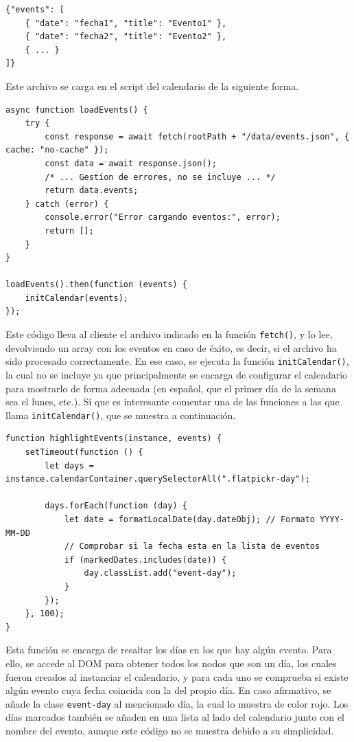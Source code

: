 \documentclass[11pt, a4paper]{book}
\begin{document}
	\begin{lstlisting}
{"events": [
	{ "date": "fecha1", "title": "Evento1" },
	{ "date": "fecha2", "title": "Evento2" },
    { ... }
]}
	\end{lstlisting}

	Este archivo se carga en el script del calendario de la siguiente forma.
	
	\begin{lstlisting}
async function loadEvents() {
	try {
		const response = await fetch(rootPath + "/data/events.json", { cache: "no-cache" });
		const data = await response.json();
		/* ... Gestion de errores, no se incluye ... */
		return data.events;
	} catch (error) {
		console.error("Error cargando eventos:", error);
		return [];
	}
}

loadEvents().then(function (events) {
	initCalendar(events);
});
	\end{lstlisting}
	
	Este código lleva al cliente el archivo indicado en la función \texttt{fetch()}, y lo lee, devolviendo un array con los eventos en caso de éxito, es decir, si el archivo ha sido procesado correctamente. En ese caso, se ejecuta la función \texttt{initCalendar()}, la cual no se incluye ya que principalmente se encarga de configurar el calendario para mostrarlo de forma adecuada (en español, que el primer día de la semana sea el lunes, etc.). Sí que es interesante comentar una de las funciones a las que llama \texttt{initCalendar()}, que se muestra a continuación.
	
	\begin{lstlisting}
function highlightEvents(instance, events) {
	setTimeout(function () {
		let days = instance.calendarContainer.querySelectorAll(".flatpickr-day");
		
		days.forEach(function (day) {
			let date = formatLocalDate(day.dateObj); // Formato YYYY-MM-DD
			// Comprobar si la fecha esta en la lista de eventos
			if (markedDates.includes(date)) {
				day.classList.add("event-day");
			}
		});
	}, 100);
}
	\end{lstlisting}
	
	Esta función se encarga de resaltar los días en los que hay algún evento. Para ello, se accede al DOM para obtener todos los nodos que son un día, los cuales fueron creados al instanciar el calendario, y para cada uno se comprueba si existe algún evento cuya fecha coincida con la del propio día. En caso afirmativo, se añade la clase \texttt{event-day} al mencionado día, la cual lo muestra de color rojo. Los días marcados también se añaden en una lista al lado del calendario junto con el nombre del evento, aunque este código no se muestra debido a su simplicidad.
	
\end{document}
